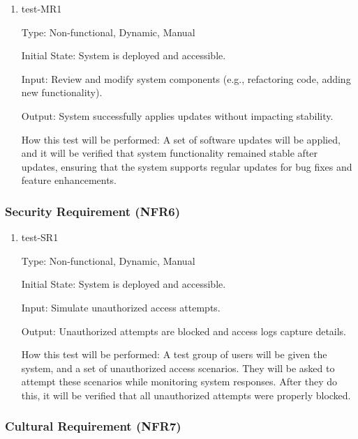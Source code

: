 \documentclass[12pt, titlepage]{article}
\begin{document}
\begin{enumerate}
    \item{test-MR1} \label{test-MR1}
    
    Type: Non-functional, Dynamic, Manual
    
    Initial State: System is deployed and accessible.
    
    Input: Review and modify system components (e.g., refactoring code, adding new functionality).
    
    Output: System successfully applies updates without impacting stability.
    
    How this test will be performed: A set of software updates will be applied, and it will be verified that system functionality remained stable after updates, ensuring that the system supports regular updates for bug fixes and feature enhancements.
\end{enumerate}

\subsubsection{Security Requirement (NFR6)} \label{section:4.2.6}

\begin{enumerate}
    \item{test-SR1} \label{test-SR1}
    
    Type: Non-functional, Dynamic, Manual
    
    Initial State: System is deployed and accessible.
    
    Input: Simulate unauthorized access attempts.
    
    Output: Unauthorized attempts are blocked and access logs capture details.
    
    How this test will be performed: A test group of users will be given the system, and a set of unauthorized access scenarios. They will be asked to attempt these scenarios while monitoring system responses. After they do this, it will be verified that all unauthorized attempts were properly blocked.
\end{enumerate}

\subsubsection{Cultural Requirement (NFR7)} \label{section:4.2.7}
\end{document}
